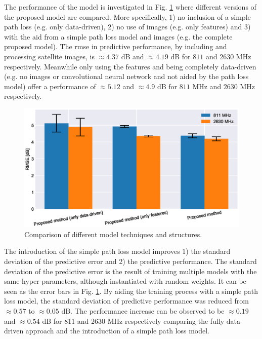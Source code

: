 The performance of the model is investigated in Fig. \ref{fig:train_models_barplot} where different versions of the proposed model are compared. More specifically, 1) no inclusion of a simple path loss (e.g. only data-driven), 2) no use of images (e.g. only features) and 3) with the aid from a simple path loss model and images (e.g. the complete proposed model). The \gls{rmse} in predictive performance, by including and processing satellite images, is  $\approx 4.37$ dB and $\approx 4.19 $ dB for $811$ and $2630$ MHz respectively. Meanwhile only using the features and being completely data-driven (e.g. no images or convolutional neural network and not aided by the path loss model) offer a performance of $\approx 5.12$ and $\approx 4.9$ dB for $811$ MHz and $2630$ MHz respectively. 


\begin{figure}
    \centering
    \includegraphics{chapters/part_pathloss/model_aided_paper/trainedmodels_barplot.eps}
    \caption{Comparison of different model techniques and structures.}
    \label{fig:train_models_barplot}
\end{figure}

The introduction of the simple path loss model improves 1) the standard deviation of the predictive error and 2) the predictive performance. The standard deviation of the predictive error is the result of training multiple models with the same hyper-parameters, although instantiated with random weights. It can be seen as the error bars in Fig. \ref{fig:train_models_barplot}. By aiding the training process with a simple path loss model, the standard deviation of predictive performance was reduced from $\approx 0.57$ to $\approx 0.05$ dB. The performance increase can be observed to be $\approx 0.19$ and $\approx 0.54$ dB for 811 and 2630 MHz respectively comparing the fully data-driven approach and the introduction of a simple path loss model. 

